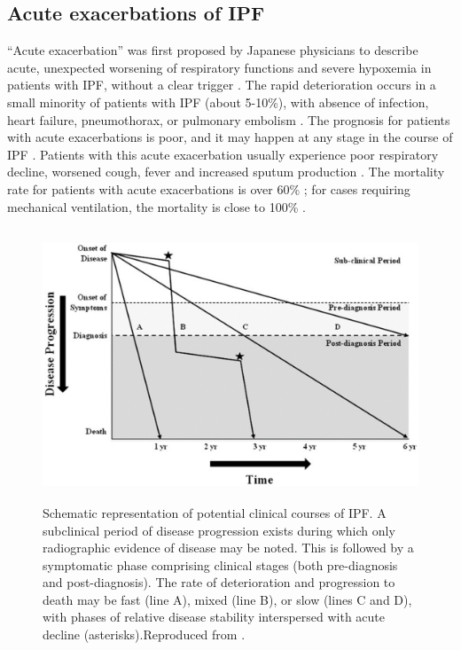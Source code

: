 \subsection{Acute exacerbations of IPF}
“Acute exacerbation” was first proposed by Japanese physicians to describe acute, unexpected worsening of respiratory functions and severe hypoxemia in patients with IPF, without a clear trigger \citep{kondoh1993acute, gross1962concept}. The rapid deterioration occurs in a small minority of patients with IPF (about 5-10\%), with absence of infection, heart failure, pneumothorax, or pulmonary embolism \citep{azuma2005double,king2011idiopathic,raghu2011official}. The prognosis for patients with acute exacerbations is poor, and it may happen at any stage in the course of IPF \citep{kim2006acute,parambil2005histopathologic,sakamoto2009acute,kondoh2010prognostic}. Patients with this acute exacerbation usually experience poor respiratory decline, worsened cough, fever and increased sputum production \citep{ambrosini2003acute,kim2006acute}. The mortality rate for patients with acute exacerbations is over 60\% \citep{wootton2011viral, lettieri2006prevalence}; for cases requiring mechanical ventilation, the mortality is close to 100\% \citep{king2011idiopathic,xaubet2017idiopathic}.

\begin{figure}[htbp]
  \centering 
  \includegraphics[height=3.2in]{Background/Image/IPFDiseaseProgression.png}
  \caption{Schematic representation of potential clinical courses of IPF.  A subclinical period of disease progression exists during which only radiographic evidence of disease may be noted. This is followed by a symptomatic phase comprising clinical stages (both pre-diagnosis and post-diagnosis). The rate of deterioration and progression to death may be fast (line A), mixed (line B), or slow (lines C and D), with phases of relative disease stability interspersed with acute decline (asterisks).Reproduced from \citep{ley2011clinical}.}
  \label{fig:IPFDiseaseProgression}
\end{figure}

